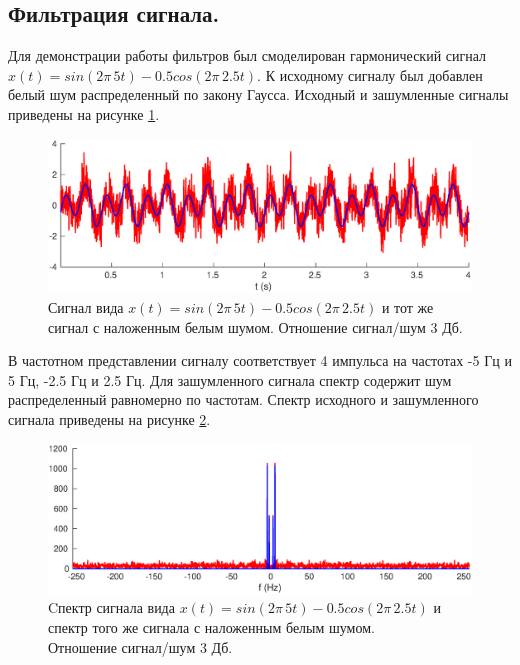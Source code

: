 \documentclass[a4paper,14pt]{extarticle}
\begin{document}
\subsection{Фильтрация сигнала.}

Для демонстрации работы фильтров был смоделирован гармонический  сигнал $x(t) = sin(2\pi \, 5 t) - 0.5 cos(2\pi \, 2.5 t)$. К исходному сигналу был добавлен белый шум распределенный по закону Гаусса. Исходный и зашумленные сигналы приведены на рисунке \ref{sig}.
 
\begin{figure}[H]
\centering
\includegraphics[width=\textwidth]{signal.eps}
\captionsetup{justification=centering,margin=0.5cm}
\caption{Сигнал вида $x(t) = sin(2\pi \, 5 t) - 0.5 cos(2\pi \, 2.5 t)$ и тот же сигнал с наложенным белым шумом. Отношение сигнал/шум 3 Дб.}
\label{sig}
\end{figure}

В частотном представлении сигналу соответствует 4 импульса на частотах -5 Гц и 5 Гц, -2.5 Гц и 2.5 Гц. Для зашумленного сигнала спектр содержит шум распределенный равномерно по частотам. Спектр 
исходного и зашумленного сигнала приведены на рисунке \ref{spec}.

\begin{figure}[H]
\centering
\includegraphics[width=1\textwidth]{spectrum.eps}
\captionsetup{justification=centering,margin=0.5cm}
\caption{Cпектр сигнала вида $x(t) = sin(2\pi \, 5 t) - 0.5 cos(2\pi \, 2.5 t)$ и спектр того же сигнала с наложенным белым шумом. \\Отношение сигнал/шум 3 Дб.}
\label{spec}
\end{figure}
\end{document}
